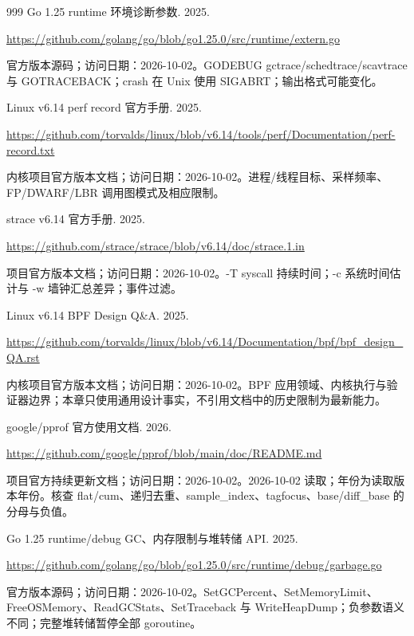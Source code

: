 \documentclass[UTF8,fontset=fandol,openany,11pt]{ctexbook}
\begin{document}
\begin{thebibliography}{999}
 Go 1.25 runtime 环境诊断参数. 2025.\par
\url{https://github.com/golang/go/blob/go1.25.0/src/runtime/extern.go}\par
{\small 官方版本源码；访问日期：2026-10-02。GODEBUG gctrace/\allowbreak{}schedtrace/\allowbreak{}scavtrace 与 GOTRACEBACK；crash 在 Unix 使用 SIGABRT；输出格式可能变化。}

 Linux v6.14 perf record 官方手册. 2025.\par
\url{https://github.com/torvalds/linux/blob/v6.14/tools/perf/Documentation/perf-record.txt}\par
{\small 内核项目官方版本文档；访问日期：2026-10-02。进程/\allowbreak{}线程目标、采样频率、FP/\allowbreak{}DWARF/\allowbreak{}LBR 调用图模式及相应限制。}

 strace v6.14 官方手册. 2025.\par
\url{https://github.com/strace/strace/blob/v6.14/doc/strace.1.in}\par
{\small 项目官方版本文档；访问日期：2026-10-02。-\allowbreak{}T syscall 持续时间；-\allowbreak{}c 系统时间估计与 -\allowbreak{}w 墙钟汇总差异；事件过滤。}

 Linux v6.14 BPF Design Q\&A. 2025.\par
\url{https://github.com/torvalds/linux/blob/v6.14/Documentation/bpf/bpf_design_QA.rst}\par
{\small 内核项目官方版本文档；访问日期：2026-10-02。BPF 应用领域、内核执行与验证器边界；本章只使用通用设计事实，不引用文档中的历史限制为最新能力。}

 google/pprof 官方使用文档. 2026.\par
\url{https://github.com/google/pprof/blob/main/doc/README.md}\par
{\small 项目官方持续更新文档；访问日期：2026-10-02。2026-\allowbreak{}10-\allowbreak{}02 读取；年份为读取版本年份。核查 flat/\allowbreak{}cum、递归去重、sample\_\allowbreak{}index、tagfocus、base/\allowbreak{}diff\_\allowbreak{}base 的分母与负值。}

 Go 1.25 runtime/debug GC、内存限制与堆转储 API. 2025.\par
\url{https://github.com/golang/go/blob/go1.25.0/src/runtime/debug/garbage.go}\par
{\small 官方版本源码；访问日期：2026-10-02。SetGCPercent、SetMemoryL\allowbreak{}imit、FreeOSMemory、ReadGCStats、SetTraceback 与 WriteHeapD\allowbreak{}ump；负参数语义不同；完整堆转储暂停全部 goroutine。}


\end{thebibliography}
\end{document}
